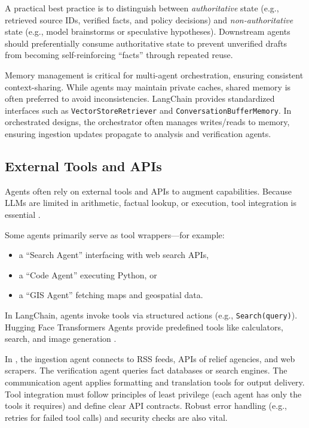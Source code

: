 A practical best practice is to distinguish between \emph{authoritative} state (e.g., retrieved source IDs, verified facts, and policy decisions) and \emph{non-authoritative} state (e.g., model brainstorms or speculative hypotheses).
Downstream agents should preferentially consume authoritative state to prevent unverified drafts from becoming self-reinforcing ``facts'' through repeated reuse.

Memory management is critical for multi-agent orchestration, ensuring consistent context-sharing. While agents may maintain private caches, shared memory is often preferred to avoid inconsistencies. LangChain provides standardized interfaces such as \texttt{VectorStoreRetriever} and \texttt{ConversationBufferMemory}. In orchestrated designs, the orchestrator often manages writes/reads to memory, ensuring ingestion updates propagate to analysis and verification agents.  

\subsection{External Tools and APIs}
Agents often rely on external tools and APIs to augment capabilities. Because LLMs are limited in arithmetic, factual lookup, or execution, tool integration is essential \cite{huggingfaceAgents,huggingfaceAgents2}.  

Some agents primarily serve as tool wrappers—for example:  
\begin{itemize}
    \item a “Search Agent” interfacing with web search APIs,  
    \item a “Code Agent” executing Python, or  
    \item a “GIS Agent” fetching maps and geospatial data.  
\end{itemize}

In LangChain, agents invoke tools via structured actions (e.g., \texttt{Search(query)}). Hugging Face Transformers Agents provide predefined tools like calculators, search, and image generation \cite{huggingfaceAgents3,huggingfaceAgents4}.  

In \ishtar{}, the ingestion agent connects to RSS feeds, APIs of relief agencies, and web scrapers. The verification agent queries fact databases or search engines. The communication agent applies formatting and translation tools for output delivery. Tool integration must follow principles of least privilege (each agent has only the tools it requires) and define clear API contracts. Robust error handling (e.g., retries for failed tool calls) and security checks are also vital.  



